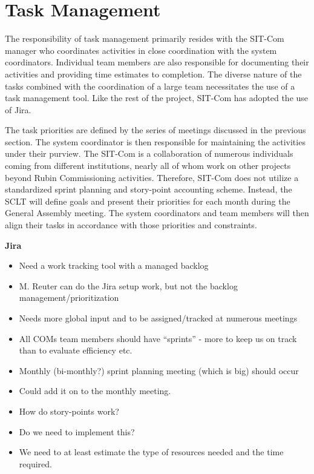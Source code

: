 \documentclass[SE,lsstdraft,authoryear,toc]{lsstdoc}
\begin{document}
\section{Task Management}
\label{sec:task_management}

The responsibility of task management primarily resides with the SIT-Com manager who coordinates activities in close coordination with the system coordinators.
Individual team members are also responsible for documenting their activities and providing time estimates to completion.
The diverse nature of the tasks combined with the coordination of a large team necessitates the use of a task management tool.
Like the rest of the project, SIT-Com has adopted the use of Jira.

The task priorities are defined by the series of meetings discussed in the previous section.
The system coordinator is then responsible for maintaining the activities under their purview.
The SIT-Com is a collaboration of numerous individuals coming from different institutions, nearly all of whom work on other projects beyond Rubin Commissioning activities.
Therefore, SIT-Com does not utilize a standardized sprint planning and story-point accounting scheme.
Instead, the SCLT will define goals and present their priorities for each month during the General Assembly meeting.
The system coordinators and team members will then align their tasks in accordance with those priorities and constraints.

\textbf{Jira}
\begin{itemize}
    \item Need a work tracking tool with a managed backlog
    \item M. Reuter can do the Jira setup work, but not the backlog management/prioritization
    \item Needs more global input and to be assigned/tracked at numerous meetings
    \item All COMs team members should have “sprints” - more to keep us on track than to evaluate efficiency etc.
    \item Monthly (bi-monthly?) sprint planning meeting (which is big) should occur
    \item Could add it on to the monthly meeting.
    \item How do story-points work?
    \item Do we need to implement this?
    \item We need to at least estimate the type of resources needed and the time required.
\end{itemize}
\end{document}
